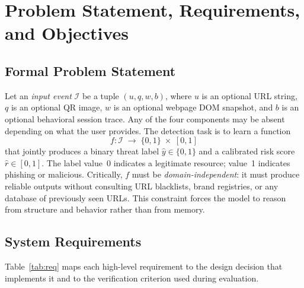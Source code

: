 \documentclass[conference]{IEEEtran}
\begin{document}
\section{Problem Statement, Requirements, and Objectives}

\subsection{Formal Problem Statement}
Let an \textit{input event} $\mathcal{I}$ be a tuple $(u, q, w, b)$, where $u$ is an optional
URL string, $q$ is an optional QR image, $w$ is an optional webpage DOM snapshot, and $b$ is an
optional behavioral session trace.
Any of the four components may be absent depending on what the user provides.
The detection task is to learn a function
\begin{equation}
  f : \mathcal{I} \;\rightarrow\; \{0,1\} \;\times\; [0,1]
\end{equation}
that jointly produces a binary threat label $\hat{y}\in\{0,1\}$ and a calibrated risk score
$\hat{r}\in[0,1]$.
The label value~0 indicates a legitimate resource; value~1 indicates phishing or malicious.
Critically, $f$ must be \textit{domain-independent}: it must produce reliable outputs without
consulting URL blacklists, brand registries, or any database of previously seen URLs.
This constraint forces the model to reason from structure and behavior rather than from memory.

\subsection{System Requirements}
Table~\ref{tab:req} maps each high-level requirement to the design decision that implements it
and to the verification criterion used during evaluation.
\end{document}
